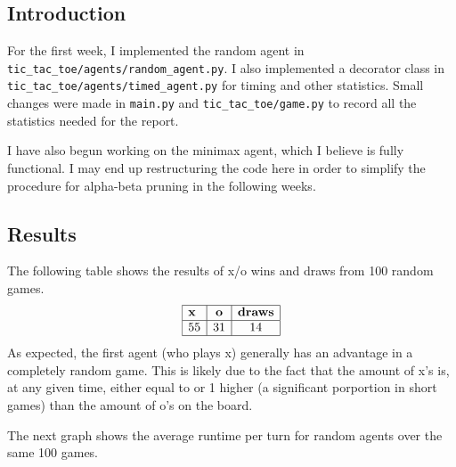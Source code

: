 \documentclass[12pt]{article}
\begin{document}
\subsection*{Introduction}
For the first week, I implemented the random agent in \texttt{tic\_tac\_toe/agents/random\_agent.py}. I also implemented a decorator class in \texttt{tic\_tac\_toe/agents/timed\_agent.py} for timing and other statistics. Small changes were made in \texttt{main.py} and \texttt{tic\_tac\_toe/game.py} to record all the statistics needed for the report.

I have also begun working on the minimax agent, which I believe is fully functional. I may end up restructuring the code here in order to simplify the procedure for alpha-beta pruning in the following weeks.

\subsection*{Results}
The following table shows the results of x/o wins and draws from 100 random games.
\[
    \begin{array}{|l|c|c|}
        \hline
        \textbf{x} & \textbf{o} & \textbf{draws}\\
        \hline
        55 & 31 & 14\\
        \hline
    \end{array}    
\]
As expected, the first agent (who plays x) generally has an advantage in a completely random game. This is likely due to the fact that the amount of x's is, at any given time, either equal to or 1 higher (a significant porportion in short games) than the amount of o's on the board.

The next graph shows the average runtime per turn for random agents over the same 100 games.

\begin{center}
\end{center}
\end{document}
